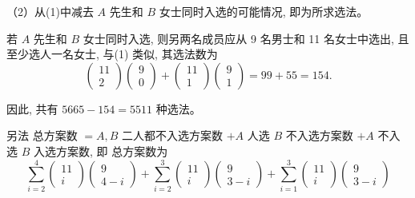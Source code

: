 \documentclass[13pt, punct]{ctexbeamer}
\begin{document}
\begin{frame}
（2）从(1)中减去 $A$ 先生和 $B$ 女士同时入选的可能情况, 即为所求选法。

若 $A$ 先生和 $B$ 女士同时入选, 则另两名成员应从 9 名男士和 11 名女士中选出, 且至少选人一名女士, 与(1) 类似, 其选法数为
$$
\left(\begin{array}{c}
    11 \\
    2
\end{array}\right)\left(\begin{array}{l}
    9 \\
    0
\end{array}\right)+\left(\begin{array}{c}
    11 \\
    1
\end{array}\right)\left(\begin{array}{l}
    9 \\
    1
\end{array}\right)=99+55=154.
$$

因此, 共有 $5665-154=5511$ 种选法。


另法 \quad 总方案数 $=A, B$ 二人都不入选方案数 $+A$ 人选 $B$ 不入选方案数 $+A$ 不入选 $B$ 入选方案数, 即
总方案数为 $$ \sum_{i=2}^4\left(\begin{array}{c}11 \\ i\end{array}\right)\left(\begin{array}{c}9 \\ 4-i\end{array}\right)+\sum_{i=2}^3\left(\begin{array}{c}11 \\ i\end{array}\right)\left(\begin{array}{c}9 \\ 3-i\end{array}\right)+\sum_{i=1}^3\left(\begin{array}{c}11 \\ i\end{array}\right)\left(\begin{array}{c}9 \\ 3-i\end{array}\right)$$

\end{frame}
\end{document}
